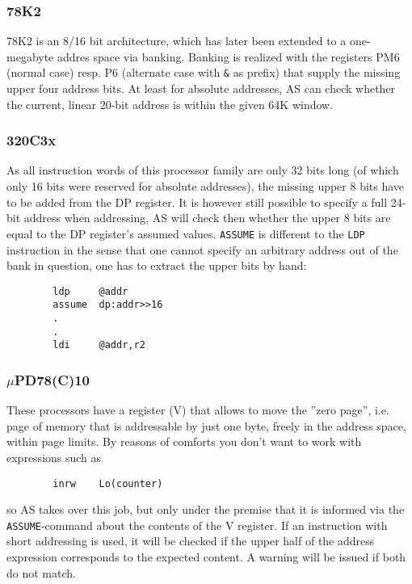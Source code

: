 \documentclass[12pt,twoside]{report}
\newcommand{\tty}[1]{{\tt #1}}
\begin{document}

\subsubsection{78K2}

78K2 is an 8/16 bit architecture, which has later been extended to a
one-megabyte addres space via banking.  Banking is realized with the
registers PM6 (normal case) resp. P6 (alternate case with \verb!&! as
prefix) that supply the missing upper four address bits.  At least for
absolute addresses, AS can check whether the current, linear 20-bit
address is within the given 64K window.


\subsubsection{320C3x}

As all instruction words of this processor family are only 32 bits
long (of which only 16 bits were reserved for absolute addresses),
the missing upper 8 bits have to be added from the DP register.  It
is however still possible to specify a full 24-bit address when
addressing, AS will check then whether the upper 8 bits are equal to
the DP register's assumed values.  \tty{ASSUME} is different to the
\tty{LDP} instruction in the sense that one cannot specify an arbitrary
address out of the bank in question, one has to extract the upper bits by
hand:
\begin{verbatim}
        ldp     @addr
        assume  dp:addr>>16
        .
        .
        ldi     @addr,r2
\end{verbatim}


\subsubsection{$\mu$PD78(C)10}

These processors have a register (V) that allows to move the ''zero
page'', i.e. page of memory that is addressable by just one byte,
freely in the address space, within page limits.  By reasons of
comforts you don't want to work with expressions such as
\begin{verbatim}
        inrw    Lo(counter)
\end{verbatim}
so AS takes over this job, but only under the premise that it is informed
via the \tty{ASSUME}-command about the contents of the V register.  If an
instruction with short addressing is used, it will be checked if the upper
half of the address expression corresponds to the expected content.  A
warning will be issued if both do not match.
\end{document}
